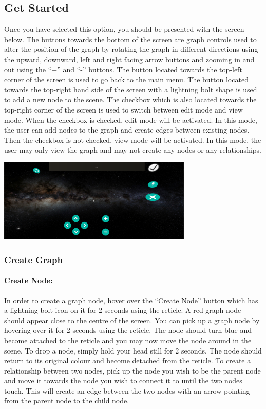 \documentclass[english]{article}
\begin{document}
\subsection{Get Started}
Once you have selected this option, you should be presented with the screen below. The buttons towards the bottom of the screen are graph controls used to alter the position of the graph by rotating the graph in different directions using the upward, downward, left and right facing arrow buttons and zooming in and out using the “+” and “-” buttons. The button located towards the top-left corner of the screen is used to go back to the main menu. The button located towards the top-right hand side of the screen with a lightning bolt shape is used to add a new node to the scene. The checkbox which is also located towards the top-right corner of the screen is used to switch between edit mode and view mode. When the checkbox is checked, edit mode will be activated. In this mode, the user can add nodes to the graph and create edges between existing nodes. Then the checkbox is not checked, view mode will be activated. In this mode, the user may only view the graph and may not create any nodes or any relationships. 

\includegraphics[width=350px]{Images/GetStartednterface.PNG}

\subsubsection{Create Graph}
\paragraph{Create Node: }
In order to create a graph node, hover over the “Create Node” button which has a lightning bolt icon on it for 2 seconds using the reticle. A red graph node should appear close to the centre of the screen. You can pick up a graph node by hovering over it for 2 seconds using the reticle. The node should turn blue and become attached to the reticle and you may now move the node around in the scene. To drop a node, simply hold your head still for 2 seconds. The node should return to its original colour and become detached from the reticle. To create a relationship between two nodes, pick up the node you wish to be the parent node and move it towards the node you wish to connect it to until the two nodes touch. This will create an edge between the two nodes with an arrow pointing from the parent node to the child node.
\end{document}
